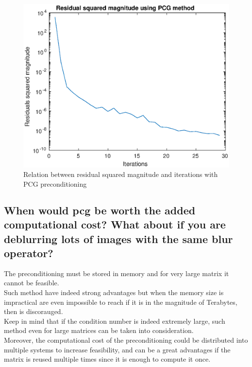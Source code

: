 \documentclass[unicode,11pt,a4paper,oneside,numbers=endperiod,openany]{scrartcl}
\begin{document}
\begin{figure}[H]
    \centering
    \caption{Relation between residual squared magnitude and iterations with PCG preconditioning}
    \label{fig:ex4-7-residuals-pcg}
    \includegraphics[width=\textwidth, trim={0cm 0cm 0cm 0cm}, clip]{./figures/ex4-7-residuals-pcg.eps}
\end{figure}

\subsection{When would pcg be worth the added computational cost? What about if you are deblurring lots of images with
    the same blur operator?}

The preconditioning must be stored in memory and for very large matrix it cannot be feasible.\\
Such method have indeed strong advantages but when the memory size is impractical are even impossible to
reach if it is in the magnitude of Terabytes, then is discorauged.\\
Keep in mind that if the condition number is indeed extremely large, such method even for large
matrices can be taken into consideration.\\
Moreover, the computational cost of the preconditioning could be distributed into multiple systems
to increase feasibility, and can be a great advantages if the matrix is reused multiple times
since it is enough to compute it once.
\end{document}
